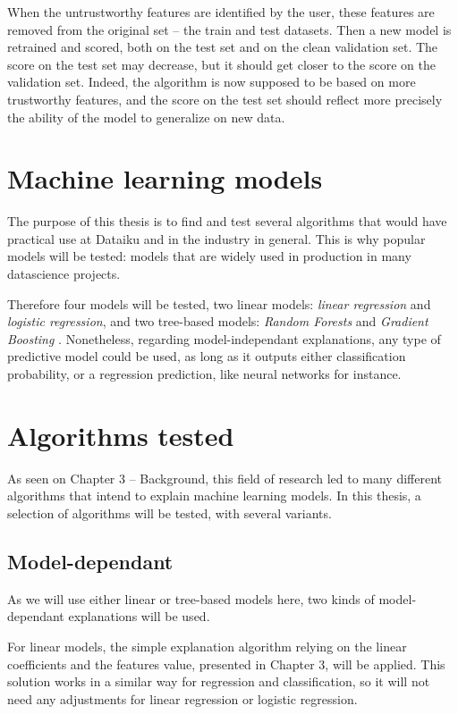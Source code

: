 \documentclass[a4paper,11pt]{kth-mag}
\begin{document}
When the untrustworthy features are identified by the user, these features are removed from the original set -- the train and test datasets. Then a new model is retrained and scored, both on the test set and on the clean validation set. The score on the test set may decrease, but it should get closer to the score on the validation set. Indeed, the algorithm is now supposed to be based on more trustworthy features, and the score on the test set should reflect more precisely the ability of the model to generalize on new data.

\section{Machine learning models}

The purpose of this thesis is to find and test several algorithms that would have practical use at Dataiku and in the industry in general. This is why popular models will be tested: models that are widely used in production in many datascience projects.

Therefore four models will be tested, two linear models: \textit{linear regression} and \textit{logistic regression}, and two tree-based models: \textit{Random Forests} \cite{Breiman2001} and \textit{Gradient Boosting} \cite{Friedman2001}. Nonetheless, regarding model-independant explanations, any type of predictive model could be used, as long as it outputs either classification probability, or a regression prediction, like neural networks for instance.

\section{Algorithms tested}

As seen on Chapter 3 -- Background, this field of research led to many different algorithms that intend to explain machine learning models. In this thesis, a selection of algorithms will be tested, with several variants.

\subsection{Model-dependant}

As we will use either linear or tree-based models here, two kinds of model-dependant explanations will be used.

For linear models, the simple explanation algorithm relying on the linear coefficients and the features value, presented in Chapter 3, will be applied. This solution works in a similar way for regression and classification, so it will not need any adjustments for linear regression or logistic regression.
\end{document}
